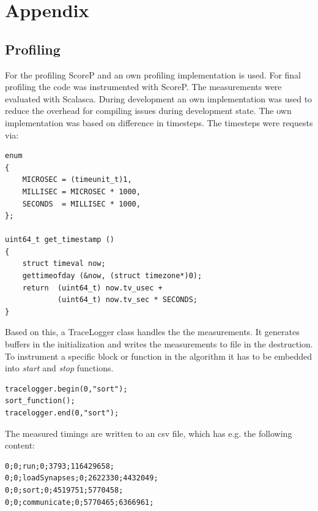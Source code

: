 %

\chapter{Appendix}

\section{Profiling}

For the profiling ScoreP and an own profiling implementation is used.
For final profiling the code was instrumented with ScoreP.
The measurements were evaluated with Scalasca.
During development an own implementation was used to reduce the overhead for compiling issues during development state.
The own implementation was based on difference in timesteps.
The timesteps were requests via:
\begin{lstlisting}
enum
{
	MICROSEC = (timeunit_t)1,
	MILLISEC = MICROSEC * 1000,
	SECONDS  = MILLISEC * 1000,
};

uint64_t get_timestamp ()
{
    struct timeval now;
    gettimeofday (&now, (struct timezone*)0);
    return  (uint64_t) now.tv_usec + 
            (uint64_t) now.tv_sec * SECONDS;
}
\end{lstlisting}

Based on this, a TraceLogger class handles the the measurements.
It generates buffers in the initialization and writes the measurements to file in the destruction.
To instrument a specific block or function in the algorithm it has to be embedded into \emph{start} and \emph{stop} functions.
\begin{lstlisting}
tracelogger.begin(0,"sort");
sort_function();
tracelogger.end(0,"sort");
\end{lstlisting}

The measured timings are written to an csv file, which has e.g. the following content:
\begin{lstlisting}
0;0;run;0;3793;116429658;
0;0;loadSynapses;0;2622330;4432049;
0;0;sort;0;4519751;5770458;
0;0;communicate;0;5770465;6366961;
\end{lstlisting}

